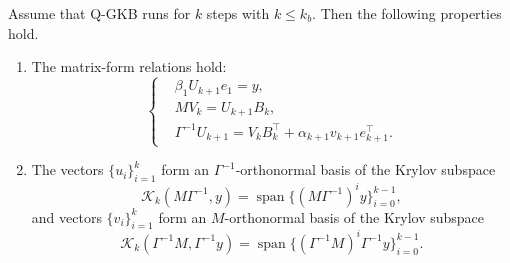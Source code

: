 \documentclass[]{myarticle}
\begin{document}
\begin{proposition}\label{thm:qsggkb-properties}
Assume that Q-GKB runs for $k$ steps with $k\leq k_b$. Then the following properties hold.
\begin{enumerate}
\item[(a)] The matrix-form relations hold:
\begin{equation}\label{eq:bidiag-relations}
\left\{
\begin{aligned}
& \beta_1 U_{k+1} e_1 = y, \\
& M V_{k} = U_{k+1} B_k, \\
& \Gamma^{-1} U_{k+1} = V_{k} B_k^\top + \alpha_{k+1} v_{k+1} e_{k+1}^\top .
\end{aligned}
\right.
\end{equation}
\item[(b)] The vectors $\{u_i\}_{i=1}^k$ form an $\Gamma^{-1}$-orthonormal basis of the Krylov subspace
\[\mathcal K_k(M\Gamma^{-1},y) = \operatorname{span}\{(M\Gamma^{-1})^i y\}_{i=0}^{k-1},\]
and vectors $\{v_i\}_{i=1}^k$ form an $M$-orthonormal basis of the Krylov subspace
\[\mathcal K_k(\Gamma^{-1}M,\Gamma^{-1}y) = \operatorname{span}\{(\Gamma^{-1}M)^i\Gamma^{-1}y\}_{i=0}^{k-1}.\]
\end{enumerate}
\end{proposition}
\end{document}
